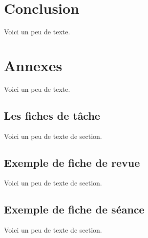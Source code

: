     
    \section{Conclusion}
    Voici un peu de texte.
    
    \section{Annexes}
    Voici un peu de texte.
    \subsection{Les fiches de tâche}
    Voici un peu de texte de section.
    \subsection{Exemple de fiche de revue}
    Voici un peu de texte de section.
    \subsection{Exemple de fiche de séance}
    Voici un peu de texte de section.

